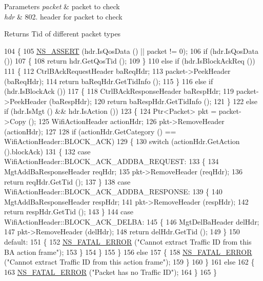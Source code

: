 \begin{DoxyParams}{Parameters}
{\em packet} & packet to check \\
\hline
{\em hdr} & 802. header for packet to check\\
\hline
\end{DoxyParams}
Returns Tid of different packet types 
\begin{DoxyCode}
104 \{
105   \hyperlink{assert_8h_a6dccdb0de9b252f60088ce281c49d052}{NS\_ASSERT} (hdr.IsQosData () || packet != 0);
106   \textcolor{keywordflow}{if} (hdr.IsQosData ())
107     \{
108       \textcolor{keywordflow}{return} hdr.GetQosTid ();
109     \}
110   \textcolor{keywordflow}{else} \textcolor{keywordflow}{if} (hdr.IsBlockAckReq ())
111     \{
112       CtrlBAckRequestHeader baReqHdr;
113       packet->PeekHeader (baReqHdr);
114       \textcolor{keywordflow}{return} baReqHdr.GetTidInfo ();
115     \}
116   \textcolor{keywordflow}{else} \textcolor{keywordflow}{if} (hdr.IsBlockAck ())
117     \{
118       CtrlBAckResponseHeader baRespHdr;
119       packet->PeekHeader (baRespHdr);
120       \textcolor{keywordflow}{return} baRespHdr.GetTidInfo ();
121     \}
122   \textcolor{keywordflow}{else} \textcolor{keywordflow}{if} (hdr.IsMgt () && hdr.IsAction ())
123     \{
124       Ptr<Packet> pkt = packet->Copy ();
125       WifiActionHeader actionHdr;
126       pkt->RemoveHeader (actionHdr);
127 
128       \textcolor{keywordflow}{if} (actionHdr.GetCategory () == WifiActionHeader::BLOCK\_ACK)
129         \{
130           \textcolor{keywordflow}{switch} (actionHdr.GetAction ().blockAck)
131             \{
132             \textcolor{keywordflow}{case} WifiActionHeader::BLOCK\_ACK\_ADDBA\_REQUEST:
133               \{
134                 MgtAddBaResponseHeader reqHdr;
135                 pkt->RemoveHeader (reqHdr);
136                 \textcolor{keywordflow}{return} reqHdr.GetTid ();
137               \}
138             \textcolor{keywordflow}{case} WifiActionHeader::BLOCK\_ACK\_ADDBA\_RESPONSE:
139               \{
140                 MgtAddBaResponseHeader respHdr;
141                 pkt->RemoveHeader (respHdr);
142                 \textcolor{keywordflow}{return} respHdr.GetTid ();
143               \}
144             \textcolor{keywordflow}{case} WifiActionHeader::BLOCK\_ACK\_DELBA:
145               \{
146                 MgtDelBaHeader delHdr;
147                 pkt->RemoveHeader (delHdr);
148                 \textcolor{keywordflow}{return} delHdr.GetTid ();
149               \}
150             \textcolor{keywordflow}{default}:
151               \{
152                 \hyperlink{group__fatal_ga5131d5e3f75d7d4cbfd706ac456fdc85}{NS\_FATAL\_ERROR} (\textcolor{stringliteral}{"Cannot extract Traffic ID from this BA action frame"});
153               \}
154             \}
155         \}
156       \textcolor{keywordflow}{else}
157         \{
158           \hyperlink{group__fatal_ga5131d5e3f75d7d4cbfd706ac456fdc85}{NS\_FATAL\_ERROR} (\textcolor{stringliteral}{"Cannot extract Traffic ID from this action frame"});
159         \}
160     \}
161   \textcolor{keywordflow}{else}
162     \{
163       \hyperlink{group__fatal_ga5131d5e3f75d7d4cbfd706ac456fdc85}{NS\_FATAL\_ERROR} (\textcolor{stringliteral}{"Packet has no Traffic ID"});
164     \}
165 \}
\end{DoxyCode}


